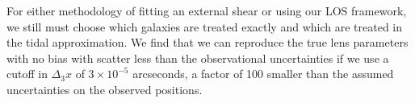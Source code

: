 For either methodology of fitting an external shear or using our LOS framework, we still must choose which galaxies are treated exactly and which are treated in the tidal approximation. We find that we can reproduce the true lens parameters with no bias with scatter less than the observational uncertainties if we use a cutoff in $\Delta_3x$ of $3\times 10^{-5}$ arcseconds, a factor of 100 smaller than the assumed uncertainties on the observed positions.